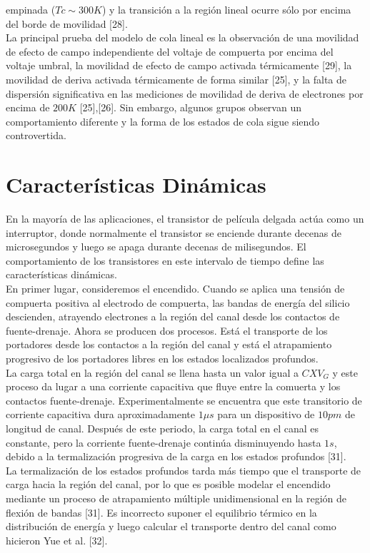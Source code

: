 \documentclass[conference]{IEEEtran}
\begin{document}
    empinada ($Tc \sim 300 K$) y la transición a la región lineal ocurre sólo por encima del 
    borde de movilidad [28].
    \\
    La principal prueba del modelo de cola lineal es la observación de una movilidad de efecto de 
    campo independiente del voltaje de compuerta por encima del voltaje umbral, la movilidad de 
    efecto de campo activada térmicamente [29], la movilidad de deriva activada térmicamente de 
    forma similar [25], y la falta de dispersión significativa en las mediciones de movilidad de 
    deriva de electrones por encima de $200 K$ [25],[26]. Sin embargo, algunos grupos observan 
    un comportamiento diferente y la forma de los estados de cola sigue siendo controvertida.

\section{Características Dinámicas}
    En la mayoría de las aplicaciones, el transistor de película delgada actúa como un interruptor, 
    donde normalmente el transistor se enciende durante decenas de microsegundos y luego se apaga 
    durante decenas de milisegundos. El comportamiento de los transistores en este intervalo de 
    tiempo define las características dinámicas.
    \\
    En primer lugar, consideremos el encendido. Cuando se aplica una tensión de compuerta positiva 
    al electrodo de compuerta, las bandas de energía del silicio descienden, atrayendo electrones 
    a la región del canal desde los contactos de fuente-drenaje. Ahora se producen dos procesos. 
    Está el transporte de los portadores desde los contactos a la región del canal y está el 
    atrapamiento progresivo de los portadores libres en los estados localizados profundos.
    \\
    La carga total en la región del canal se llena hasta un valor igual a $C X V_G$ y este proceso 
    da lugar a una corriente capacitiva que fluye entre la comuerta y los contactos fuente-drenaje. 
    Experimentalmente se encuentra que este transitorio de corriente capacitiva dura aproximadamente 
    $1 \mu s$ para un dispositivo de $10 pm$ de longitud de canal. Después de este periodo, 
    la carga total en el canal es constante, pero la corriente fuente-drenaje continúa disminuyendo 
    hasta $1 s$, debido a la termalización progresiva de la carga en los estados profundos [31].
    \\
    La termalización de los estados profundos tarda más tiempo que el transporte de carga hacia 
    la región del canal, por lo que es posible modelar el encendido mediante un proceso de atrapamiento 
    múltiple unidimensional en la región de flexión de bandas [31]. Es incorrecto suponer el equilibrio
    térmico en la distribución de energía y luego calcular el transporte dentro del canal como 
    hicieron Yue et al. [32].
\end{document}

